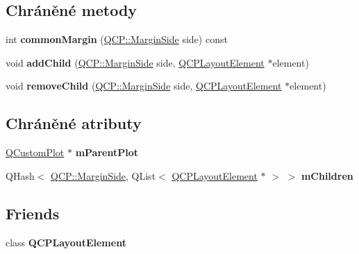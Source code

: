 \subsection*{Chráněné metody}
\begin{DoxyCompactItemize}
\item 
\hypertarget{classQCPMarginGroup_aeaeba9068dba2ef8be41449f0f2582f7}{}int {\bfseries common\+Margin} (\hyperlink{namespaceQCP_a7e487e3e2ccb62ab7771065bab7cae54}{Q\+C\+P\+::\+Margin\+Side} side) const \label{classQCPMarginGroup_aeaeba9068dba2ef8be41449f0f2582f7}

\item 
\hypertarget{classQCPMarginGroup_acb9c3a35acec655c2895b7eb95ee0524}{}void {\bfseries add\+Child} (\hyperlink{namespaceQCP_a7e487e3e2ccb62ab7771065bab7cae54}{Q\+C\+P\+::\+Margin\+Side} side, \hyperlink{classQCPLayoutElement}{Q\+C\+P\+Layout\+Element} $\ast$element)\label{classQCPMarginGroup_acb9c3a35acec655c2895b7eb95ee0524}

\item 
\hypertarget{classQCPMarginGroup_a20ab3286062957d99b58db683fe725b0}{}void {\bfseries remove\+Child} (\hyperlink{namespaceQCP_a7e487e3e2ccb62ab7771065bab7cae54}{Q\+C\+P\+::\+Margin\+Side} side, \hyperlink{classQCPLayoutElement}{Q\+C\+P\+Layout\+Element} $\ast$element)\label{classQCPMarginGroup_a20ab3286062957d99b58db683fe725b0}

\end{DoxyCompactItemize}
\subsection*{Chráněné atributy}
\begin{DoxyCompactItemize}
\item 
\hypertarget{classQCPMarginGroup_a23cfa29e3cc0f33a59141b77d8c04edf}{}\hyperlink{classQCustomPlot}{Q\+Custom\+Plot} $\ast$ {\bfseries m\+Parent\+Plot}\label{classQCPMarginGroup_a23cfa29e3cc0f33a59141b77d8c04edf}

\item 
\hypertarget{classQCPMarginGroup_a954bc89ff8958b9bb6a4a0d08ed5fc0f}{}Q\+Hash$<$ \hyperlink{namespaceQCP_a7e487e3e2ccb62ab7771065bab7cae54}{Q\+C\+P\+::\+Margin\+Side}, Q\+List$<$ \hyperlink{classQCPLayoutElement}{Q\+C\+P\+Layout\+Element} $\ast$ $>$ $>$ {\bfseries m\+Children}\label{classQCPMarginGroup_a954bc89ff8958b9bb6a4a0d08ed5fc0f}

\end{DoxyCompactItemize}
\subsection*{Friends}
\begin{DoxyCompactItemize}
\item 
\hypertarget{classQCPMarginGroup_a0790750c7e7f14fdbd960d172655b42b}{}class {\bfseries Q\+C\+P\+Layout\+Element}\label{classQCPMarginGroup_a0790750c7e7f14fdbd960d172655b42b}

\end{DoxyCompactItemize}



